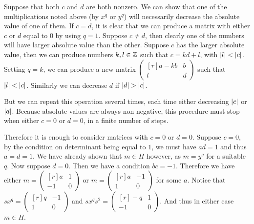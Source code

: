 \begin{solution}
	Suppose that both $c$ and $d$ are both nonzero. We can show that one of the multiplications noted above (by $x^q$ or $y^q$) will necessarily decrease the absolute value of one of them. If $c = d$, it is clear that we can produce a matrix with either $c$ or $d$ equal to $0$ by using $q = 1$. Suppose $c \neq d$, then clearly one of the numbers will have larger absolute value than the other. Suppose $c$ has the larger absolute value, then we can produce numbers $k, l \in \mathbb{Z}$ such that $c = k d + l$, with $\left|l\right| < \left|c\right|$. Setting $q = k$, we can produce a new matrix
	$\begin{pmatrix*}[r]
		a - kb & b \\
		l & d
	\end{pmatrix*}$
	such that $\left|l\right| < \left|c\right|$. Similarly we can decrease $d$ if $\left|d\right| > \left|c\right|$.
	
	But we can repeat this operation several times, each time either decreasing $\left|c\right|$ or $\left|d\right|$. Because absolute values are always non-negative, this procedure must stop when either $c = 0$ or $d = 0$, in a finite number of steps.
	
	Therefore it is enough to consider matrices with $c = 0$ or $d = 0$. Suppose $c = 0$, by the condition on determinant being equal to $1$, we must have $ad = 1$ and thus $a = d = 1$. We have already shown that $m \in H$ however, as $m = y^q$ for a suitable $q$. Now suppose $d = 0$. Then we have a condition $bc = -1$. Therefore we have either
	$m = 
	\begin{pmatrix*}[r]
		a & 1 \\
		-1 & 0
	\end{pmatrix*}$
	or
	$m = 
	\begin{pmatrix*}[r]
		a & -1 \\
		1 & 0
	\end{pmatrix*}$ for some $a$. Notice that $s x^q =
	\begin{pmatrix*}[r]
		q & -1 \\
		1 & 0
	\end{pmatrix*}$ and $ s x^q s^2 =
	\begin{pmatrix*}[r]
		-q & 1 \\
		-1 & 0
	\end{pmatrix*}$. And thus in either case $m \in H$.
\end{solution}

\begin{problem}
\end{problem}

